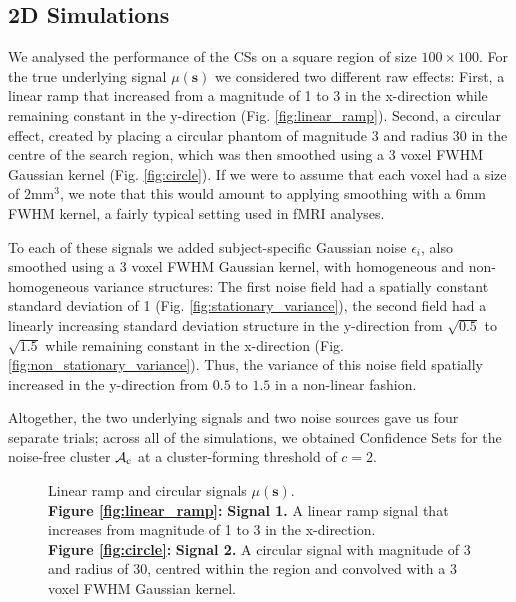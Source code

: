 \subsection{2D Simulations}
\label{sec:2D_simulations}
We analysed the performance of the CSs on a square region of size $100 \times 100$. For the true underlying signal $\mu(\bm{s})$ we considered two different raw effects: First, a linear ramp that increased from a magnitude of 1 to 3 in the x-direction while remaining constant in the y-direction (Fig. \ref{fig:linear_ramp}). Second, a circular effect, created by placing a circular phantom of magnitude 3 and radius 30 in the centre of the search region, which was then smoothed using a 3 voxel FWHM Gaussian kernel (Fig. \ref{fig:circle}). If we were to assume that each voxel had a size of $2$mm$^{3}$, we note that this would amount to applying smoothing with a $6$mm FWHM kernel, a fairly typical setting used in fMRI analyses.

To each of these signals we added subject-specific Gaussian noise $\epsilon_{i}$, also smoothed using a 3 voxel FWHM Gaussian kernel, with homogeneous and non-homogeneous variance structures: The first noise field had a spatially constant standard deviation of 1 (Fig. \ref{fig:stationary_variance}), the second field had a linearly increasing standard deviation structure in the y-direction from $\sqrt{0.5}$ to $\sqrt{1.5}$ while remaining constant in the x-direction (Fig. \ref{fig:non_stationary_variance}). Thus, the variance of this noise field spatially increased in the y-direction from $0.5$ to $1.5$ in a non-linear fashion. 

Altogether, the two underlying signals and two noise sources gave us four separate trials; across all of the simulations, we obtained Confidence Sets for the noise-free cluster $\operatorname{\mathcal{A}_{c}}$ at a cluster-forming threshold of $c = 2$. 

\begin{figure}[htbp]\label{fig:2D_signals}%
\centering
{}
\caption{Linear ramp and circular signals $\mu(\bm{s})$. \\ \textbf{Figure \ref{fig:linear_ramp}:} \textbf{Signal 1.} A linear ramp signal that increases from magnitude of 1 to 3 in the x-direction. \\ \textbf{Figure \ref{fig:circle}:} \textbf{Signal 2.} A circular signal with magnitude of 3 and radius of 30, centred within the region and convolved with a 3 voxel FWHM Gaussian kernel.}
\end{figure}

